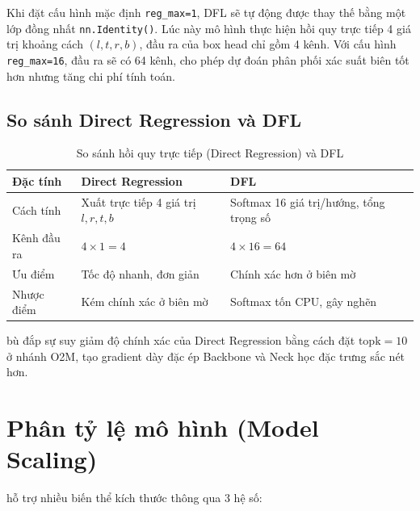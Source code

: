 \begin{notebox}[YOLO26 mặc định: reg\_max=1 --- không dùng DFL]
Khi đặt cấu hình mặc định \texttt{reg\_max=1}, DFL sẽ tự động được thay thế bằng một lớp đồng nhất \texttt{nn.Identity()}. Lúc này mô hình thực hiện hồi quy trực tiếp 4 giá trị khoảng cách $(l, t, r, b)$, đầu ra của box head chỉ gồm 4 kênh. Với cấu hình \texttt{reg\_max=16}, đầu ra sẽ có 64 kênh, cho phép dự đoán phân phối xác suất biên tốt hơn nhưng tăng chi phí tính toán.
\end{notebox}

\subsection{So sánh Direct Regression và DFL}

\begin{table}[H]
    \centering
    \caption{So sánh hồi quy trực tiếp (Direct Regression) và DFL}
    \label{tab:direct_vs_dfl}
    \begin{tabularx}{\textwidth}{lXX}
        \toprule
        \textbf{Đặc tính} & \textbf{Direct Regression} & \textbf{DFL} \\
        \midrule
        Cách tính & Xuất trực tiếp 4 giá trị $l, r, t, b$ & Softmax 16 giá trị/hướng, tổng trọng số \\
        Kênh đầu ra & $4 \times 1 = 4$ & $4 \times 16 = 64$ \\
        Ưu điểm & Tốc độ nhanh, đơn giản & Chính xác hơn ở biên mờ \\
        Nhược điểm & Kém chính xác ở biên mờ & Softmax tốn CPU, gây nghẽn \\
        \bottomrule
    \end{tabularx}
\end{table}

\yolo bù đắp sự suy giảm độ chính xác của Direct Regression bằng cách đặt $\text{topk}=10$ ở nhánh O2M, tạo gradient dày đặc ép Backbone và Neck học đặc trưng sắc nét hơn.

\section{Phân tỷ lệ mô hình (Model Scaling)}
\label{sec:arch_scaling}

\yolo hỗ trợ nhiều biến thể kích thước thông qua 3 hệ số:

